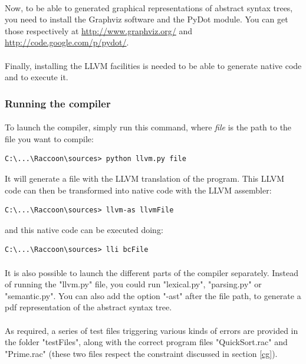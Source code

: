 \documentclass[12pt,a4paper]{article}
\begin{document}
\paragraph{}
Now, to be able to generated graphical representations of abstract syntax trees, you need to install the Graphviz software and the PyDot module. You can get those respectively at \url{http://www.graphviz.org/} and \url{http://code.google.com/p/pydot/}.

\paragraph{}
Finally, installing the LLVM facilities is needed to be able to generate native code and to execute it.

\subsubsection{Running the compiler}
\paragraph{}
To launch the compiler, simply run this command, where \textit{file} is the path to the file you want to compile: 
\begin{verbatim}
C:\...\Raccoon\sources> python llvm.py file
\end{verbatim}
It will generate a file with the LLVM translation of the program. This LLVM code can then be transformed into native code with the LLVM assembler:
\begin{verbatim}
C:\...\Raccoon\sources> llvm-as llvmFile
\end{verbatim}
and this native code can be executed doing:
\begin{verbatim}
C:\...\Raccoon\sources> lli bcFile
\end{verbatim}

\paragraph{}
It is also possible to launch the different parts of the compiler separately. Instead of running the "llvm.py" file, you could run "lexical.py", "parsing.py" or "semantic.py". You can also add the option "-ast" after the file path, to generate a pdf representation of the abstract syntax tree.

\paragraph{}
As required, a series of test files triggering various kinds of errors are provided in the folder "testFiles", along with the correct program files "QuickSort.rac" and "Prime.rac" (these two files respect the constraint discussed in section \ref{cg}).
\end{document}
